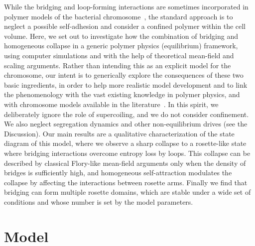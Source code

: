 \documentclass[
preprint,
a4paper,
12pt,
superscriptaddress,
pre]{revtex4}
\begin{document}
While the bridging and loop-forming interactions are sometimes
incorporated in polymer models of the bacterial
chromosome~\cite{Barbieri2013a,Junier2013,Fritsche2012,Heermann2012,Barbieri2012,Junier2010},
the standard approach is to neglect a possible self-adhesion and
consider a confined polymer within the cell volume.
Here, we set out to investigate how the combination of bridging and
homogeneous collapse in a generic polymer physics (equilibrium)
framework, using computer simulations and with the help of theoretical
mean-field and scaling arguments.
Rather than intending this as an explicit model for the chromosome,
our intent is to generically explore the consequences of these two
basic ingredients, in order to help more realistic model development
and to link the phenomenology with the vast existing knowledge in
polymer physics, and with chromosome models available in the
literature~\cite{Barbieri2013a,Junier2010,Benza2012}.
In this spirit, we deliberately ignore the role of supercoiling, and
we do not consider confinement. We also neglect segregation dynamics
and other non-equilibrium drives (see the Discussion).
Our main results are a qualitative characterization of the state
diagram of this model, where we observe a sharp collapse to a
rosette-like state where bridging interactions overcome entropy loss
by loops. This collapse can be described by classical Flory-like
mean-field arguments only when the density of bridges is sufficiently
high, and homogeneous self-attraction modulates the collapse by
affecting the interactions between rosette arms. Finally we find that
bridging can form multiple rosette domains, which are stable under a
wide set of conditions and whose number is set by the model
parameters.


\section{Model}
\end{document}
